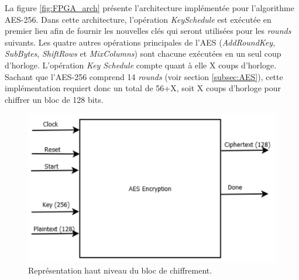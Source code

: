 \documentclass[oneside]{book}
\begin{document}
La figure \ref{fig:FPGA_arch} présente l'architecture implémentée pour l'algorithme AES-256. Dans cette architecture, l'opération \textit{KeySchedule} est exécutée en premier lieu afin de fournir les nouvelles clés qui seront utilisées pour les \textit{rounds} suivants. Les quatre autres opérations principales de l'AES (\textit{AddRoundKey}, \textit{SubBytes}, \textit{ShiftRows} et \textit{MixColumns}) sont chacune exécutées en un seul coup d'horloge. L'opération \textit{Key Schedule} compte quant à elle X coups d'horloge. Sachant que l'AES-256 comprend 14 \textit{rounds} (voir section \ref{subsec:AES}), cette implémentation requiert donc un total de 56+X, soit X coups d'horloge pour chiffrer un bloc de 128 bits.

\begin{figure}[htbp]
    \centering
    \includegraphics[scale=0.35]{image/FPGA_AES_TOP}
    \caption{Représentation haut niveau du bloc de chiffrement.}
    \label{fig:FPGA_AES_TOP} 
\end{figure}
\end{document}
